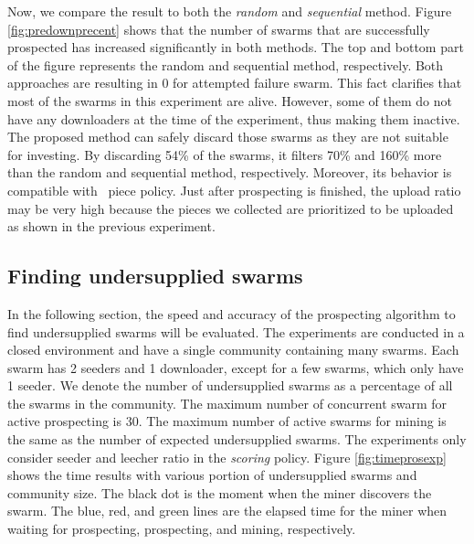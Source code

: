 Now, we compare the result to both the \textit{random} and \textit{sequential} method. Figure \ref{fig:predownprecent} shows that the number of swarms that are successfully prospected has increased significantly in both methods. The top and bottom part of the figure represents the random and sequential method, respectively. Both approaches are resulting in 0 for attempted failure swarm. This fact clarifies that most of the swarms in this experiment are alive. However, some of them do not have any downloaders at the time of the experiment, thus making them inactive. The proposed method can safely discard those swarms as they are not suitable for investing. By discarding 54\% of the swarms, it filters 70\% and 160\% more than the random and sequential method, respectively. Moreover, its behavior is compatible with \bt~piece policy. Just after prospecting is finished, the upload ratio may be very high because the pieces we collected are prioritized to be uploaded as shown in the previous experiment.

\subsection{Finding undersupplied swarms}
In the following section, the speed and accuracy of the prospecting algorithm to find undersupplied swarms will be evaluated. The experiments are conducted in a closed environment and have a single community containing many swarms. Each swarm has 2 seeders and 1 downloader, except for a few swarms, which only have 1 seeder. We denote the number of undersupplied swarms as a percentage of all the swarms in the community. The maximum number of concurrent swarm for active prospecting is 30. The maximum number of active swarms for mining is the same as the number of expected undersupplied swarms. The experiments only consider seeder and leecher ratio in the \textit{scoring} policy. Figure \ref{fig:timeprosexp} shows the time results with various portion of undersupplied swarms and community size. The black dot is the moment when the miner discovers the swarm. The blue, red, and green lines are the elapsed time for the miner when waiting for prospecting, prospecting, and mining, respectively.

